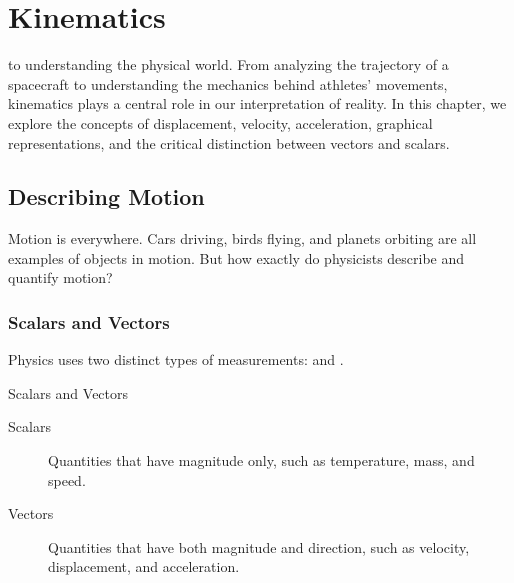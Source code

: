\chapter{Kinematics}
\label{ch:kinematics}

 to understanding the physical world. From analyzing the trajectory of a spacecraft to understanding the mechanics behind athletes' movements, kinematics plays a central role in our interpretation of reality. In this chapter, we explore the concepts of displacement, velocity, acceleration, graphical representations, and the critical distinction between vectors and scalars.  

\section{Describing Motion}
\FloatBarrier

Motion is everywhere. Cars driving, birds flying, and planets orbiting are all examples of objects in motion. But how exactly do physicists describe and quantify motion?

\subsection{Scalars and Vectors}
\FloatBarrier

Physics uses two distinct types of measurements:  and .

\begin{keyconcept}{Scalars and Vectors}
\begin{description}
    \item[Scalars] Quantities that have magnitude only, such as temperature, mass, and speed.
    \item[Vectors] Quantities that have both magnitude and direction, such as velocity, displacement, and acceleration.
\end{description}
\end{keyconcept}



